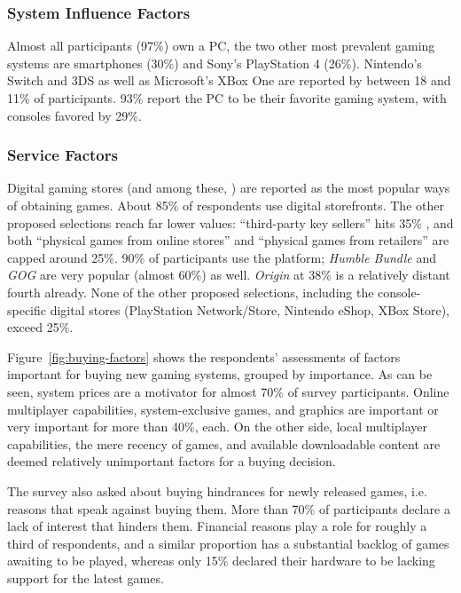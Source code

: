 \subsubsection{System Influence Factors}
Almost all participants (97\%) own a PC, the two other most prevalent
gaming systems are smartphones (30\%) and Sony's PlayStation 4 (26\%).
Nintendo's Switch and 3DS as well as Microsoft's XBox One are reported
by between 18 and 11\% of participants.
93\% report the PC to be their favorite gaming system, with consoles
favored by 29\%.



\subsubsection{Service Factors}

Digital gaming stores (and among these, \steam) are reported as
the most popular ways of obtaining games. About 85\% of respondents
use digital storefronts. The other proposed selections reach far lower
values: ``third-party key sellers'' hits 35\% , and both ``physical
games from online stores'' and ``physical games from retailers''
are capped around 25\%.
90\% of participants use the \steam platform; \textit{Humble Bundle}
and \textit{GOG} are very popular (almost 60\%) as well. \textit{Origin}
at 38\% is a relatively distant fourth already. None of the other
proposed selections, including the console-specific digital stores
(PlayStation Network/Store, Nintendo eShop, XBox Store), exceed
25\%.

Figure~\ref{fig:buying-factors} shows the respondents' assessments
of factors important for buying new gaming systems, grouped by
importance. As can be seen, system prices are a motivator for
almost 70\% of survey participants. Online multiplayer capabilities,
system-exclusive games, and graphics are important or very important
for more than 40\%, each. On the other side, local multiplayer
capabilities, the mere recency of games, and available downloadable
content are deemed relatively unimportant factors for a buying decision.

The survey also asked about buying hindrances for newly released 
games, i.e. reasons that speak against buying them.
More than 70\% of participants declare a lack of interest
that hinders them. Financial reasons play a role for roughly
a third of respondents, and a similar proportion has a substantial
backlog of games awaiting to be played, whereas only 15\% declared
their hardware to be lacking support for the latest games.


